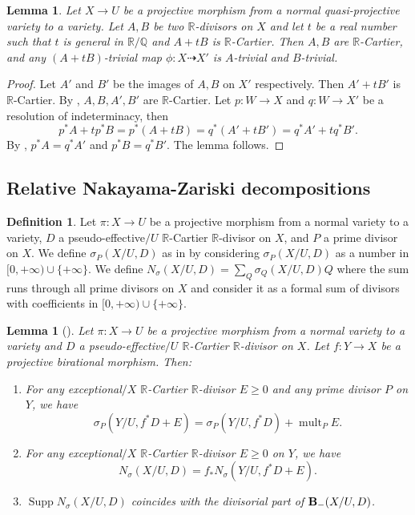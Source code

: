 \documentclass[11pt]{amsart}
\numberwithin{equation}{section}
\newcommand{\Rr}{\mathbb{R}}
\newcommand{\Supp}{\operatorname{Supp}}
\newcommand{\mult}{\operatorname{mult}}
\newcommand{\Bb}{{\bf{B}}}
\newtheorem{lem}[thm]{Lemma}
\theoremstyle{definition}
\newtheorem{defn}[thm]{Definition}
\theoremstyle{definition}
\theoremstyle{definition}
\begin{document}
\begin{lem}\label{lem: general real coefficient b-trivial}
Let $X\rightarrow U$ be a projective morphism from a normal quasi-projective variety to a variety. Let $A,B$ be two $\Rr$-divisors on $X$ and let $t$ be a real number such that $t$ is general in $\mathbb R/\mathbb Q$ and $A+tB$ is $\Rr$-Cartier. Then $A,B$ are $\Rr$-Cartier, and any $(A+tB)$-trivial map $\phi: X\dashrightarrow X'$ is $A$-trivial and $B$-trivial.
\end{lem}
\begin{proof}
Let $A'$ and $B'$ be the images of $A,B$ on $X'$ respectively. Then $A'+tB'$ is $\Rr$-Cartier.     By \cite[Lemma 5.3]{HLS19},  $A,B,A',B'$ are $\Rr$-Cartier. Let $p: W\rightarrow X$ and $q: W\rightarrow X'$ be a resolution of indeterminacy, then
$$p^*A+tp^*B=p^*(A+tB)=q^*(A'+tB')=q^*A'+tq^*B'.$$
 By \cite[Lemma 5.3]{HLS19}, $p^*A=q^*A'$ and $p^*B=q^*B'$. The lemma follows.
\end{proof}


\subsection{Relative Nakayama-Zariski decompositions}

\begin{defn}
    Let $\pi: X\rightarrow U$ be a projective morphism from a normal variety to a variety, $D$ a pseudo-effective$/U$ $\Rr$-Cartier $\Rr$-divisor on $X$, and $P$ a prime divisor on $X$. We define $\sigma_{P}(X/U,D)$ as in \cite[Definition 3.1]{LX23a} by considering $\sigma_{P}(X/U,D)$ as a number in  $[0,+\infty)\cup\{+\infty\}$. We define $N_{\sigma}(X/U,D)=\sum_Q\sigma_Q(X/U,D)Q$
    where the sum runs through all prime divisors on $X$ and consider it as a formal sum of divisors with coefficients in $[0,+\infty)\cup\{+\infty\}$.
\end{defn}

\begin{lem}[{\cite[Lemma 3.4(2)(3), Lemma 3.7(4)]{LX23a}}]\label{lem: nz keep under pullback}
Let $\pi: X\rightarrow U$ be a projective morphism from a normal variety to a variety and $D$ a pseudo-effective$/U$ $\Rr$-Cartier $\Rr$-divisor on $X$. Let $f: Y\rightarrow X$ be a projective birational morphism. Then:
\begin{enumerate}
    \item For any exceptional$/X$ $\Rr$-Cartier $\Rr$-divisor $E\ge0$ and any prime divisor $P$ on $Y$, we have $$\sigma_P(Y/U,f^*D+E)=\sigma_P(Y/U,f^*D)+\mult_PE.$$
    \item For any exceptional$/X$ $\Rr$-Cartier $\Rr$-divisor $E\ge0$ on $Y$, we have 
    $$N_{\sigma}(X/U,D)=f_*N_{\sigma}(Y/U,f^*D+E).$$
    \item $\Supp N_{\sigma}(X/U,D)$ coincides with the divisorial part of $\Bb_-(X/U,D)$.
\end{enumerate}
\end{lem}
\end{document}
